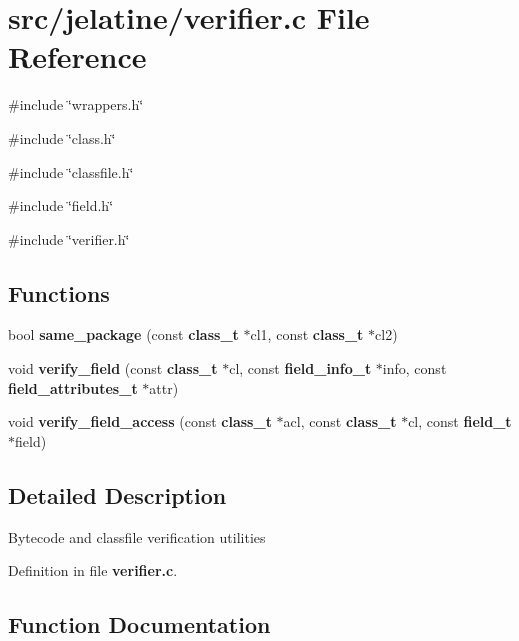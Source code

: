\section{src/jelatine/verifier.c File Reference}
\label{verifier_8c}
{\ttfamily \#include \char`\"{}wrappers.h\char`\"{}}\par
{\ttfamily \#include \char`\"{}class.h\char`\"{}}\par
{\ttfamily \#include \char`\"{}classfile.h\char`\"{}}\par
{\ttfamily \#include \char`\"{}field.h\char`\"{}}\par
{\ttfamily \#include \char`\"{}verifier.h\char`\"{}}\par
\subsection*{Functions}
\begin{DoxyCompactItemize}
\item 
bool {\bf same\_\-package} (const {\bf class\_\-t} $\ast$cl1, const {\bf class\_\-t} $\ast$cl2)
\item 
void {\bf verify\_\-field} (const {\bf class\_\-t} $\ast$cl, const {\bf field\_\-info\_\-t} $\ast$info, const {\bf field\_\-attributes\_\-t} $\ast$attr)
\item 
void {\bf verify\_\-field\_\-access} (const {\bf class\_\-t} $\ast$acl, const {\bf class\_\-t} $\ast$cl, const {\bf field\_\-t} $\ast$field)
\end{DoxyCompactItemize}


\subsection{Detailed Description}
Bytecode and classfile verification utilities 

Definition in file {\bf verifier.c}.



\subsection{Function Documentation}
